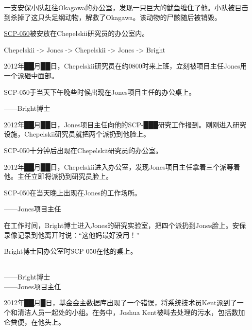 一支安保小队赶往Okagawa的办公室，发现一只巨大的鱿鱼缠住了他。小队被目击到杀掉了这只头足纲动物，解救了Okagawa。该动物的尸骸随后被销毁。

\hyperref[chap:SCP-050]{SCP-050}被安放在Chepelskii研究员的办公室内。



Chepelskii -> Jones -> Chepelskii -> Jones -> Bright


2012年██月██日，Chepelskii研究员在约0800时来上班，立刻被项目主任Jones用一个派砸中面部。

SCP-050于当天下午晚些时候出现在Jones项目主任的办公桌上。

——Bright博士


2012年██月██日，Jones项目主任向他的SCP-███研究工作报到。刚刚进入研究设施，Chepelskii研究员就把两个派扔到他脸上。

SCP-050十分钟后出现在Chepelskii研究员的办公室。


2012年██月██日，Chepelskii进入办公室，发现Jones项目主任拿着三个派等着他。主任立即将派扔到研究员脸上。

SCP-050在当天晚上出现在Jones的工作场所。

——Jones项目主任


在工作时间，Bright博士进入Jones的研究实验室，把四个派扔到Jones脸上。安保录像记录到他离开时说：“这他妈最好没用！”

Bright博士回办公室时SCP-050在他的桌上。

\\
——Bright博士\\
——Jones项目主任



2012年██月█日，基金会主数据库出现了一个错误，将系统技术员Kent派到了一个和清洁人员一起处的小组。在务中，Joshua Kent被叫去处理的污水，包括数加仑粪便，在他头上。

